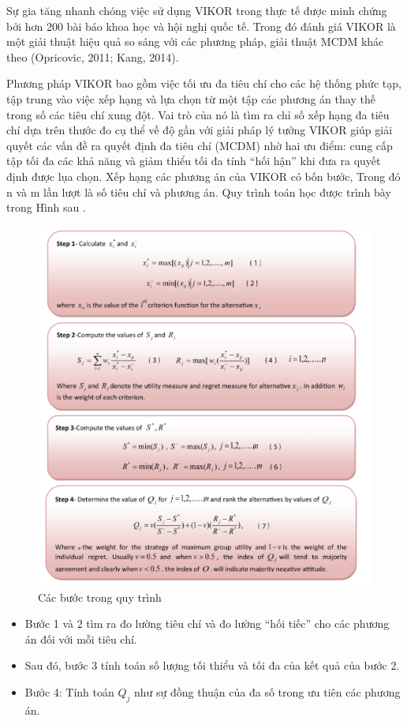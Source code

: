 Sự gia tăng nhanh chóng việc sử dụng VIKOR trong thực tế được minh chứng bởi hơn 200 bài báo khoa học và hội nghị quốc tế. Trong đó đánh giá VIKOR là một giải thuật hiệu quả so sáng với các phương pháp, giải thuật MCDM khác theo (Opricovic, 2011; Kang, 2014). 

Phương pháp VIKOR bao gồm việc tối ưu đa tiêu chí cho các hệ thống phức tạp, tập trung vào việc xếp hạng và lựa chọn từ một tập các phương án thay thế trong số các tiêu chí xung đột. Vai trò của nó là tìm ra chỉ số xếp hạng đa tiêu chí dựa trên thước đo cụ thể về độ gần với giải pháp lý tưởng VIKOR giúp giải quyết các vấn đề ra quyết định đa tiêu chí (MCDM) nhờ hai ưu điểm: cung cấp tập tối đa các khả năng và giảm thiểu tối đa tính “hối hận” khi đưa ra quyết định được lụa chọn. Xếp hạng các phương án của VIKOR có bốn bước, 
Trong đó n và m lần lượt là số tiêu chí và phương án. Quy trình toán học được trình bày trong Hình sau \cite{morteza}. 

\begin{figure}[H]
    \centering
    \includegraphics[width=0.8\linewidth]{images/VIKOR.png}
    \vspace{0.6cm}
    \caption{Các bước trong quy trình }
\end{figure}

\begin{itemize}
    \item Bước 1 và 2 tìm ra đo lường tiêu chí và đo lường “hối tiếc” cho các phương án đối với mỗi tiêu chí. 
    \item Sau đó, bước 3 tính toán số lượng tối thiểu và tối đa của kết quả của bước 2. 
    \item Bước 4: Tính toán $Q_j$ như sự đồng thuận của đa số trong ưu tiên các phương án.
\end{itemize}

